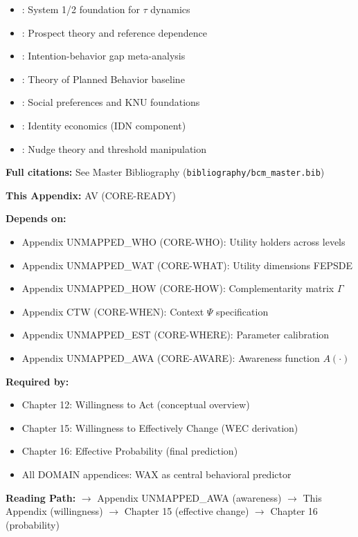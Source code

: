 \begin{itemize}[nosep]
    \item \citet{kahneman2011}: System 1/2 foundation for $\tau$ dynamics
    \item \citet{tversky1992}: Prospect theory and reference dependence
    \item \citet{sheeran2016}: Intention-behavior gap meta-analysis
    \item \citet{ajzen1991}: Theory of Planned Behavior baseline
    \item \citet{fehr1999}: Social preferences and KNU foundations
    \item \citet{akerlof2000}: Identity economics (IDN component)
    \item \citet{thaler2008}: Nudge theory and threshold manipulation
\end{itemize}

\textbf{Full citations:} See Master Bibliography (\texttt{bibliography/bcm\_master.bib})


\begin{tcolorbox}[colback=gray!10!white, colframe=gray!75!black,
    title=\textbf{Cross-Reference Footer}]

\textbf{This Appendix:} AV (CORE-READY)

\textbf{Depends on:}
\begin{itemize}[nosep]
    \item Appendix UNMAPPED_WHO (CORE-WHO): Utility holders across levels
    \item Appendix UNMAPPED_WAT (CORE-WHAT): Utility dimensions FEPSDE
    \item Appendix UNMAPPED_HOW (CORE-HOW): Complementarity matrix $\Gamma$
    \item Appendix CTW (CORE-WHEN): Context $\Psi$ specification
    \item Appendix UNMAPPED_EST (CORE-WHERE): Parameter calibration
    \item Appendix UNMAPPED_AWA (CORE-AWARE): Awareness function $A(\cdot)$
\end{itemize}

\textbf{Required by:}
\begin{itemize}[nosep]
    \item Chapter 12: Willingness to Act (conceptual overview)
    \item Chapter 15: Willingness to Effectively Change (WEC derivation)
    \item Chapter 16: Effective Probability (final prediction)
    \item All DOMAIN appendices: WAX as central behavioral predictor
\end{itemize}

\textbf{Reading Path:}
$\rightarrow$ Appendix UNMAPPED_AWA (awareness) $\rightarrow$ This Appendix (willingness)
$\rightarrow$ Chapter 15 (effective change) $\rightarrow$ Chapter 16 (probability)

\end{tcolorbox}


